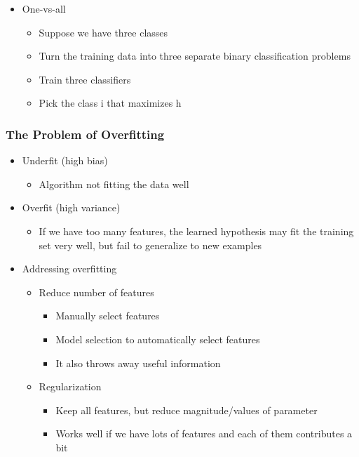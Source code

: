 \documentclass[]{article}
\providecommand{\tightlist}{%
  \setlength{\itemsep}{0pt}\setlength{\parskip}{0pt}}
\begin{document}
\begin{itemize}
\tightlist
\item
  One-vs-all

  \begin{itemize}
  \tightlist
  \item
    Suppose we have three classes
  \item
    Turn the training data into three separate binary classification
    problems
  \item
    Train three classifiers
  \item
    Pick the class i that maximizes h
  \end{itemize}
\end{itemize}

\hypertarget{the-problem-of-overfitting}{%
\subsubsection{The Problem of
Overfitting}\label{the-problem-of-overfitting}}

\begin{itemize}
\tightlist
\item
  Underfit (high bias)

  \begin{itemize}
  \tightlist
  \item
    Algorithm not fitting the data well
  \end{itemize}
\item
  Overfit (high variance)

  \begin{itemize}
  \tightlist
  \item
    If we have too many features, the learned hypothesis may fit the
    training set very well, but fail to generalize to new examples
  \end{itemize}
\item
  Addressing overfitting

  \begin{itemize}
  \tightlist
  \item
    Reduce number of features

    \begin{itemize}
    \tightlist
    \item
      Manually select features
    \item
      Model selection to automatically select features
    \item
      It also throws away useful information\\
    \end{itemize}
  \item
    Regularization

    \begin{itemize}
    \tightlist
    \item
      Keep all features, but reduce magnitude/values of parameter
    \item
      Works well if we have lots of features and each of them
      contributes a bit
    \end{itemize}
  \end{itemize}
\end{itemize}
\end{document}
